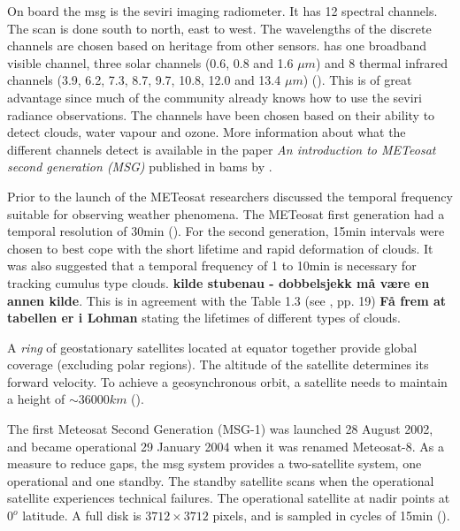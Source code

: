 On board the \acrshort{msg} is the \acrfull{seviri} imaging radiometer. It has 12 spectral channels. The scan is done south to north, east to west. The wavelengths of the discrete channels are chosen based on heritage from other sensors.  has one broadband visible channel, three solar channels (0.6, 0.8 and 1.6 $\mu m$) and 8 thermal infrared channels (3.9, 6.2, 7.3, 8.7, 9.7, 10.8, 12.0 and 13.4 $\mu m$) (\cite{Taravat2015MultilayerMasking}). This is of great advantage since much of the community already knows how to use the \acrshort{seviri} radiance observations. The channels have been chosen based on their ability to detect clouds, water vapour and ozone. More information about what the different channels detect is available in the paper \textit{An introduction to METeosat second generation (MSG)} published in \acrshort{bams} by .

Prior to the launch of the METeosat researchers discussed the temporal frequency suitable for observing weather phenomena. The METeosat first generation had a temporal resolution of 30min (\cite{Stockli2019CloudApplications}). For the second generation, 15min intervals were chosen to best cope with the short lifetime and rapid deformation of clouds. It was also suggested that a temporal frequency of 1 to 10min is necessary for tracking cumulus type clouds. \textbf{kilde stubenau - dobbelsjekk må være en annen kilde}. This is in agreement with the Table 1.3 (see \cite{lohmann2016}, pp. 19) \textbf{Få frem at tabellen er i Lohman} stating the lifetimes of different types of clouds.

A \textit{ring} of geostationary satellites located at equator together provide global coverage (excluding polar regions). The altitude of the satellite determines its forward velocity. To achieve a geosynchronous orbit, a satellite needs to maintain a height of $\sim 36 000km$ (\cite{Bley2013ASEVIRI}).  

The first Meteosat Second Generation (MSG-1) was launched 28 August 2002, and became operational 29 January 2004 when it was renamed Meteosat-8. As a measure to reduce gaps, the \acrshort{msg} system provides a two-satellite system, one operational and one standby. The standby satellite scans when the operational satellite experiences technical failures. 
The operational satellite at nadir points at $0^o$ latitude. A full disk is $3712\times 3712$ pixels, and is sampled in cycles of 15min (\cite{Schmetz_meteosat_intro}).

